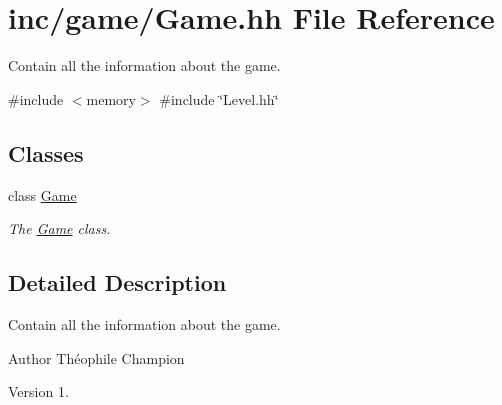 \hypertarget{Game_8hh}{}\section{inc/game/\+Game.hh File Reference}
\label{Game_8hh}


Contain all the information about the game.  


{\ttfamily \#include $<$memory$>$}\newline
{\ttfamily \#include \char`\"{}Level.\+hh\char`\"{}}\newline
\subsection*{Classes}
\begin{DoxyCompactItemize}
\item 
class \hyperlink{classGame}{Game}
\begin{DoxyCompactList}\small\item\em The \hyperlink{classGame}{Game} class. \end{DoxyCompactList}\end{DoxyCompactItemize}


\subsection{Detailed Description}
Contain all the information about the game. 

\begin{DoxyAuthor}{Author}
Théophile Champion 
\end{DoxyAuthor}
\begin{DoxyVersion}{Version}
1. 
\end{DoxyVersion}
